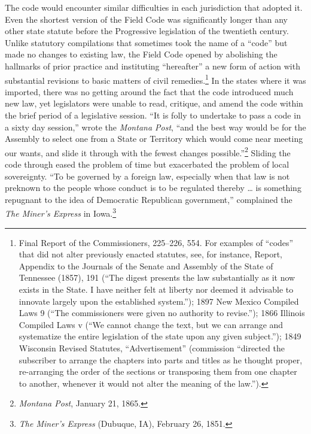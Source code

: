 \documentclass[12pt,]{article}
\let\rmarkdownfootnote\footnote%
\def\footnote{\protect\rmarkdownfootnote}
\begin{document}
The code would encounter similar difficulties in each jurisdiction that
adopted it. Even the shortest version of the Field Code was
significantly longer than any other state statute before the Progressive
legislation of the twentieth century. Unlike statutory compilations that
sometimes took the name of a ``code'' but made no changes to existing
law, the Field Code opened by abolishing the hallmarks of prior practice
and instituting ``hereafter'' a new form of action with substantial
revisions to basic matters of civil remedies.\footnote{Final Report of
  the Commissioners, 225--226, 554. For examples of ``codes'' that did
  not alter previously enacted statutes, see, for instance, Report,
  Appendix to the Journals of the Senate and Assembly of the State of
  Tennessee (1857), 191 (``The digest presents the law substantially as
  it now exists in the State. I have neither felt at liberty nor deemed
  it advisable to innovate largely upon the established system.''); 1897
  New Mexico Compiled Laws 9 (``The commissioners were given no
  authority to revise.''); 1866 Illinois Compiled Laws v (``We cannot
  change the text, but we can arrange and systematize the entire
  legislation of the state upon any given subject.''); 1849 Wisconsin
  Revised Statutes, ``Advertisement'' (commission ``directed the
  subscriber to arrange the chapters into parts and titles as he thought
  proper, re-arranging the order of the sections or transposing them
  from one chapter to another, whenever it would not alter the meaning
  of the law.'').} In the states where it was imported, there was no
getting around the fact that the code introduced much new law, yet
legislators were unable to read, critique, and amend the code within the
brief period of a legislative session. ``It is folly to undertake to
pass a code in a sixty day session,'' wrote the \emph{Montana Post},
``and the best way would be for the Assembly to select one from a State
or Territory which would come near meeting our wants, and slide it
through with the fewest changes possible.''\footnote{\emph{Montana
  Post}, January 21, 1865.} Sliding the code through eased the problem
of time but exacerbated the problem of local sovereignty. ``To be
governed by a foreign law, especially when that law is not preknown to
the people whose conduct is to be regulated thereby \ldots{} is
something repugnant to the idea of Democratic Republican government,''
complained the \emph{The Miner's Express} in Iowa.\footnote{\emph{The
  Miner's Express} (Dubuque, IA), February 26, 1851.}
\end{document}
